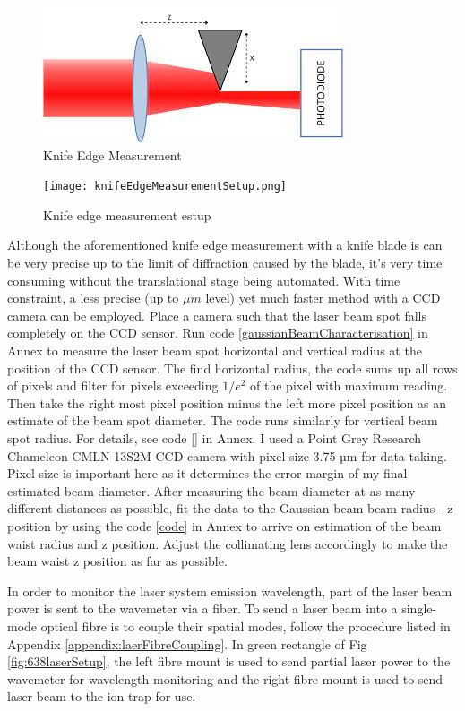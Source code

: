 \documentclass[12pt]{report}
\begin{document}
\begin{figure}[H]
    \centering
    \includegraphics[width=.6\textwidth]{knifeEdgeMeasurement.jpeg}
    \caption{Knife Edge Measurement}
    \label{fig:knifeEdgeMeasurement}
\end{figure}

\begin{figure}[H]
    \centering
    \texttt{[image: knifeEdgeMeasurementSetup.png]}
    \caption{Knife edge measurement estup}
    \label{fig:knifeEdgeMeasurementSetup}
\end{figure}

Although the aforementioned knife edge measurement with a knife blade is can be very precise up to the limit of diffraction caused by the blade, it's very time consuming without the translational stage being automated. With time constraint, a less precise (up to $\mu m$ level) yet much faster method with a CCD camera can be employed. Place a camera such that the laser beam spot falls completely on the CCD sensor. Run code \ref{gaussianBeamCharacterisation} in Annex to measure the laser beam spot horizontal and vertical radius at the position of the CCD sensor. The find horizontal radius, the code sums up all rows of pixels and filter for pixels exceeding $1/e^2$ of the pixel with maximum reading. Then take the right most pixel position minus the left more pixel position as an estimate of the beam spot diameter. The code runs similarly for vertical beam spot radius. For details, see code \ref{} in Annex. I used a Point Grey Research Chameleon CMLN-13S2M CCD camera with pixel size 3.75 µm for data taking. Pixel size is important here as it determines the error margin of my final estimated beam diameter. After measuring the beam diameter at as many different distances as possible, fit the data to the Gaussian beam beam radius - z position by using the code \ref{code} in Annex to arrive on estimation of the beam waist radius and z position. Adjust the collimating lens accordingly to make the beam waist z position as far as possible. 

In order to monitor the laser system emission wavelength, part of the laser beam power is sent to the wavemeter via a fiber. To send a laser beam into a single-mode optical fibre is to couple their spatial modes, follow the procedure listed in Appendix \ref{appendix:laerFibreCoupling}. In green rectangle of Fig \ref{fig:638laserSetup}, the left fibre mount is used to send partial laser power to the wavemeter for wavelength monitoring and the right fibre mount is used to send laser beam to the ion trap for use. 
\end{document}
